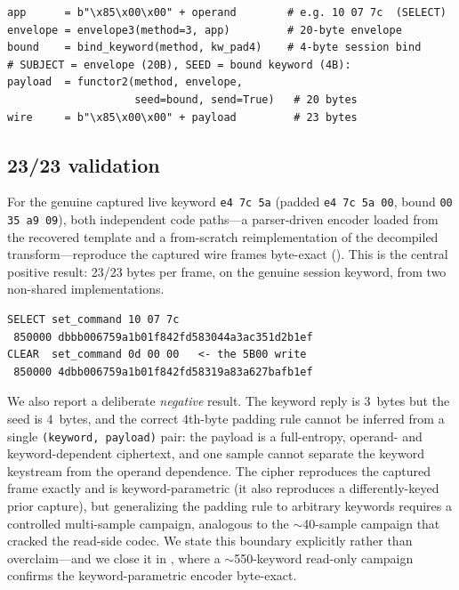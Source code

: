 \documentclass[conference]{IEEEtran}
\begin{document}
\begin{lstlisting}[language=PyFrida,caption={The validated CANON-SR5 write
construction (functor-3 envelope, functor-2 keyword bind, role-swapped).},
label={lst:cipher}]
app      = b"\x85\x00\x00" + operand        # e.g. 10 07 7c  (SELECT)
envelope = envelope3(method=3, app)         # 20-byte envelope
bound    = bind_keyword(method, kw_pad4)    # 4-byte session bind
# SUBJECT = envelope (20B), SEED = bound keyword (4B):
payload  = functor2(method, envelope,
                    seed=bound, send=True)   # 20 bytes
wire     = b"\x85\x00\x00" + payload         # 23 bytes
\end{lstlisting}

\subsection{23/23 validation}
\label{sec:cipher-valid}

For the genuine captured live keyword \texttt{e4 7c 5a} (padded
\texttt{e4 7c 5a 00}, bound \texttt{00 35 a9 09}), both independent code
paths---a parser-driven encoder loaded from the recovered template and a
from-scratch reimplementation of the decompiled transform---reproduce the
captured wire frames byte-exact (). This is the central
positive result: 23/23 bytes per frame, on the genuine session keyword,
from two non-shared implementations.

\begin{lstlisting}[style=hex,caption={Byte-exact (23/23) reproduction of
the genuine captured frames for keyword \texttt{e4 7c 5a}.},label={lst:2323}]
SELECT set_command 10 07 7c
 850000 dbbb006759a1b01f842fd583044a3ac351d2b1ef
CLEAR  set_command 0d 00 00   <- the 5B00 write
 850000 4dbb006759a1b01f842fd58319a83a627bafb1ef
\end{lstlisting}

We also report a deliberate \emph{negative} result. The keyword reply is
3~bytes but the seed is 4~bytes, and the correct 4th-byte padding rule
cannot be inferred from a single \texttt{(keyword, payload)} pair: the
payload is a full-entropy, operand- and keyword-dependent ciphertext, and
one sample cannot separate the keyword keystream from the operand
dependence. The cipher reproduces the captured frame exactly and is
keyword-parametric (it also reproduces a differently-keyed prior capture),
but generalizing the padding rule to arbitrary keywords requires a
controlled multi-sample campaign, analogous to the $\sim$40-sample
campaign that cracked the read-side codec. We state this boundary
explicitly rather than overclaim---and we close it in
, where a $\sim$550-keyword read-only
campaign confirms the keyword-parametric encoder byte-exact.
\end{document}
